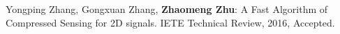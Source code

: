
\begin{publications}{99}

\item Yongping Zhang, Gongxuan Zhang, \textbf{Zhaomeng Zhu}: A Fast Algorithm of Compressed Sensing for 2D signals. IETE Technical Review, 2016, Accepted.
\end{publications}
